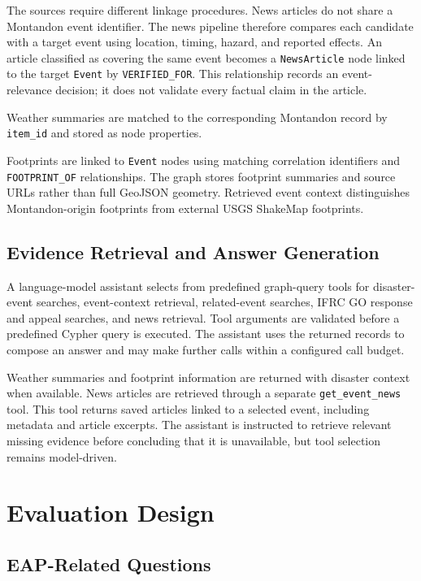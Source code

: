 \documentclass[journal]{IEEEtran}
\begin{document}
The sources require different linkage procedures. News articles do
not share a Montandon event identifier. The news pipeline therefore
compares each candidate with a target event using location, timing,
hazard, and reported effects. An article classified as covering the
same event becomes a \texttt{NewsArticle} node linked to the target
\texttt{Event} by \texttt{VERIFIED\_FOR}. This relationship records an
event-relevance decision; it does not validate every factual claim
in the article.

Weather summaries are matched to the corresponding Montandon record
by \texttt{item\_id} and stored as node properties.

Footprints are linked to \texttt{Event} nodes using matching
correlation identifiers and \texttt{FOOTPRINT\_OF} relationships.
The graph stores footprint summaries and source URLs rather than
full GeoJSON geometry. Retrieved event context distinguishes
Montandon-origin footprints from external USGS ShakeMap footprints.

\subsection{Evidence Retrieval and Answer Generation}

A language-model assistant selects from predefined graph-query tools
for disaster-event searches, event-context retrieval, related-event
searches, IFRC GO response and appeal searches, and news retrieval.
Tool arguments are validated before a predefined Cypher query is
executed. The assistant uses the returned records to compose an
answer and may make further calls within a configured call budget.

Weather summaries and footprint information are returned with
disaster context when available. News articles are retrieved through
a separate \texttt{get\_event\_news} tool. This tool returns saved
articles linked to a selected event, including metadata and article
excerpts. The assistant is instructed to retrieve relevant missing
evidence before concluding that it is unavailable, but tool
selection remains model-driven.

\section{Evaluation Design}

\subsection{EAP-Related Questions}
\end{document}
